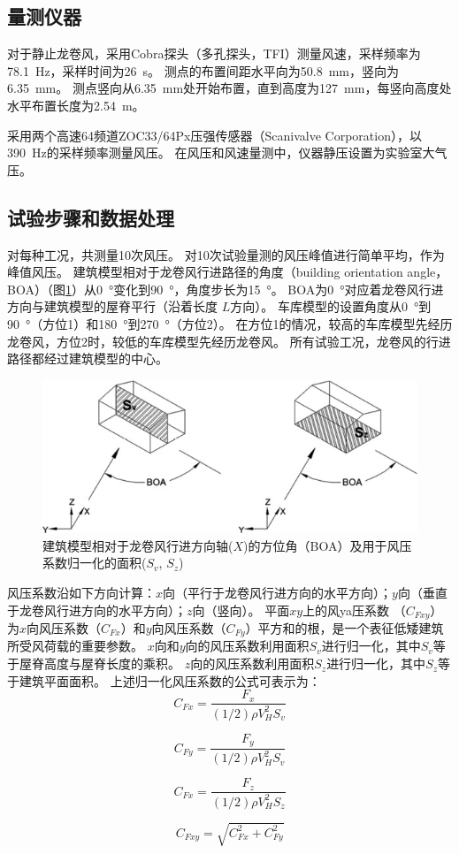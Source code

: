 \documentclass{ctexart}
\begin{document}
\subsection{量测仪器}
对于静止龙卷风，采用Cobra探头（多孔探头，TFI\textregistered ）测量风速，采样频率为\SI{78.1}{Hz}，采样时间为\SI{26}{s}。
测点的布置间距水平向为\SI{50.8}{mm}，竖向为\SI{6.35}{mm}。
测点竖向从\SI{6.35}{mm}处开始布置，直到高度为\SI{127}{mm}，每竖向高度处水平布置长度为\SI{2.54}{m}。

采用两个高速64频道ZOC33/64Px压强传感器（Scanivalve Corporation\textregistered ），以\SI{390}{Hz}的采样频率测量风压。
在风压和风速量测中，仪器静压设置为实验室大气压。

\subsection{试验步骤和数据处理}
对每种工况，共测量10次风压。
对10次试验量测的风压峰值进行简单平均，作为峰值风压。
建筑模型相对于龙卷风行进路径的角度（building orientation angle，BOA）（图\ref{fig:BOA}）从\SI{0}{\degree}变化到\SI{90}{\degree}，角度步长为\SI{15}{\degree}。
BOA为\SI{0}{\degree}对应着龙卷风行进方向与建筑模型的屋脊平行（沿着长度 $L$方向）。
车库模型的设置角度从\SI{0}{\degree}到\SI{90}{\degree}（方位1）和\SI{180}{\degree}到\SI{270}{\degree}（方位2）。
在方位1的情况，较高的车库模型先经历龙卷风，方位2时，较低的车库模型先经历龙卷风。
所有试验工况，龙卷风的行进路径都经过建筑模型的中心。

\begin{figure}
\centering
\includegraphics{./fig/3}
\caption{建筑模型相对于龙卷风行进方向轴($X$)的方位角（BOA）及用于风压系数归一化的面积($S_v$, $S_z$)}
\label{fig:BOA}
\end{figure}


风压系数沿如下方向计算：$x$向（平行于龙卷风行进方向的水平方向）；$y$向（垂直于龙卷风行进方向的水平方向）；$z$向（竖向）。
平面$xy$上的风ya压系数 （$C_{Fxy}$）为$x$向风压系数（$C_{Fx}$）和$y$向风压系数（$C_{Fy}$）平方和的根，是一个表征低矮建筑所受风荷载的重要参数。
$x$向和$y$向的风压系数利用面积$S_v$进行归一化，其中$S_v$等于屋脊高度与屋脊长度的乘积。
$z$向的风压系数利用面积$S_z$进行归一化，其中$S_z$等于建筑平面面积。
上述归一化风压系数的公式可表示为：
\begin{equation}
	C_{Fx}=\frac{F_x}{(1/2)\rho V_H^2 S_v}
\end{equation}

\begin{equation}
	C_{Fy}=\frac{F_y}{(1/2)\rho V_H^2 S_v}
\end{equation}

\begin{equation}
	C_{Fx}=\frac{F_z}{(1/2)\rho V_H^2 S_z}
\end{equation}

\begin{equation}
	C_{Fxy}=\sqrt{C_{Fx}^2+C_{Fy}^2}
\end{equation}




\printbibliography
\end{document}
